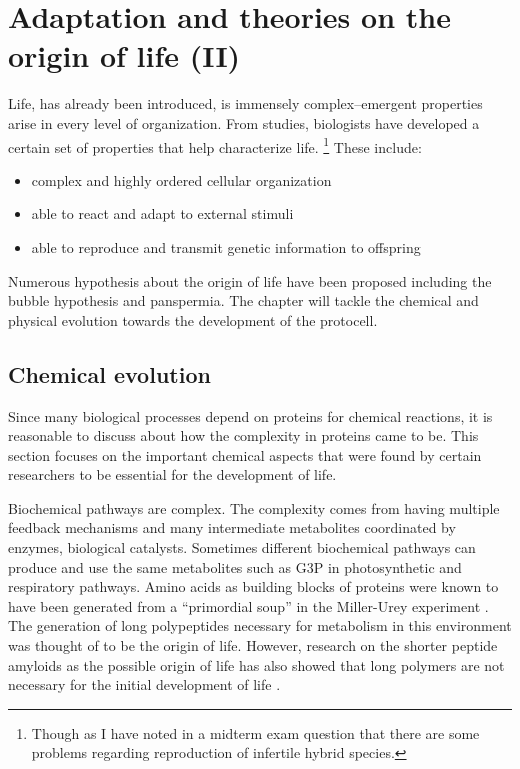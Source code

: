 \chapter{Adaptation and theories on the origin of life (II)}

Life, has already been introduced, is immensely complex--emergent properties arise in every level of organization.
From studies, biologists have developed a certain set of properties that help characterize life.
\footnote{Though as I have noted in a midterm exam question that there are some problems regarding reproduction of infertile hybrid species.}
These include:

\begin{itemize}
    \item complex and highly ordered cellular organization
    \item able to react and adapt to external stimuli
    \item able to reproduce and transmit genetic information to offspring
\end{itemize}

Numerous hypothesis about the origin of life have been proposed including the bubble hypothesis and panspermia.
The chapter will tackle the chemical and physical evolution towards the development of the protocell.

\section{Chemical evolution}
Since many biological processes depend on proteins for chemical reactions, it is reasonable to discuss about how the complexity in proteins came to be.
This section focuses on the important chemical aspects that were found by certain researchers to be essential for the development of life.

Biochemical pathways are complex.
The complexity comes from having multiple feedback mechanisms and many intermediate metabolites coordinated by enzymes, biological catalysts.
Sometimes different biochemical pathways can produce and use the same metabolites such as G3P in photosynthetic and respiratory pathways.
Amino acids as building blocks of proteins were known to have been generated from a ``primordial soup'' in the Miller-Urey experiment \cite{Maruyama2019}.
The generation of long polypeptides necessary for metabolism in this environment was thought of to be the origin of life.
However, research on the shorter peptide amyloids as the possible origin of life has also showed that long polymers are not necessary for the initial development of life \cite{Greenwald2018}.

